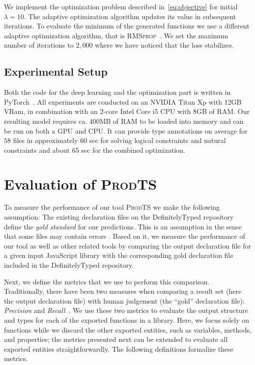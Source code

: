 \documentclass[sigplan,10pt,anonymous]{acmart} %
\newcommand{\prodts}{\textsc{ProdTS}\xspace}
\theoremstyle{plain}
\theoremstyle{remark}
\theoremstyle{definition}
\begin{document}
We implement the optimization problem described in~\eqref{eq:objective} for initial $\lambda = 10$.
The adaptive optimization algorithm updates its value in subsequent iterations.
To evaluate the minimum of the generated functions we use a different adaptive optimization algorithm, that is \textsc{RMSprop}~\cite{tieleman2014}.
We set the maximum number of iterations to $2,000$ where we have noticed that the loss stabilizes.

\subsection{Experimental Setup}

Both the code for the deep learning and the optimization part is written in PyTorch~\cite{paszke2017}.
All experiments are conducted on an NVIDIA Titan Xp with 12GB VRam, in combination with an 2-core Intel Core i5 CPU with 8GB of RAM.
Our resulting model requires ca. 400MB of RAM to be loaded into memory and can be run on both a GPU and CPU.
It can provide type annotations on average for $58$ files in approximately 60 sec for solving logical constraints and natural constraints and about 65 sec for the combined optimization.



\section{Evaluation of \prodts{}} \label{sec:eval}

To measure the performance of our tool \prodts we make the following assumption:
The existing declaration files on the DefinitelyTyped repository define the \textit{gold standard} for our predictions.
This is an assumption in the sense that some files may contain errors \citep{williams17}.
Based on it, we measure the performance of our tool as well as other related tools by comparing the output declaration file for a given input JavaScript library with the corresponding gold declaration file included in the DefinitelyTyped repository.

Next, we define the metrics that we use to perform this comparison.
Traditionally, there have been two measures when comparing a result set (here the output declaration file) with human judgement (the ``gold'' declaration file): \textit{Precision} and \textit{Recall}~\citep{russel16}.
We use these two metrics to evaluate the output structure and types for each of the exported functions in a library.
Here, we focus solely on functions while we discard the other exported entities, such as variables, methods, and properties; the metrics presented next can be extended to evaluate all exported entities straightforwardly.
The following definitions formalize these metrics.
\end{document}
